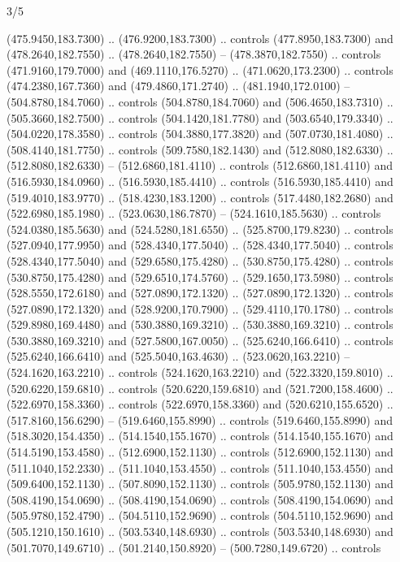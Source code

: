 \begin{flagdescription}{3/5}
\begin{scope}[shift={(0.5\flaglength,0.5\flagwidth)},scale=\flagwidth/510]
\begin{scope}[y=0.80pt, x=0.80pt, yscale=-1.06, xscale=1.06,yshift=-240pt,xshift=-400pt]
\begin{scope}[cm={{0.83333,0.0,0.0,0.83333,(154.64672,48.64761)}}]
\begin{scope}[cm={{0.93334,0.0,0.0,0.93334,(-4.86471,22.64035)}}]
\begin{scope}[line width=0.489\lw]
\begin{scope}[draw=c003300,fill=c338a00]
  (475.9450,183.7300) .. (476.9200,183.7300) .. controls (477.8950,183.7300) and
  (478.2640,182.7550) .. (478.2640,182.7550) -- (478.3870,182.7550) .. controls
  (471.9160,179.7000) and (469.1110,176.5270) .. (471.0620,173.2300) .. controls
  (474.2380,167.7360) and (479.4860,171.2740) .. (481.1940,172.0100) --
  (504.8780,184.7060) .. controls (504.8780,184.7060) and (506.4650,183.7310) ..
  (505.3660,182.7500) .. controls (504.1420,181.7780) and (503.6540,179.3340) ..
  (504.0220,178.3580) .. controls (504.3880,177.3820) and (507.0730,181.4080) ..
  (508.4140,181.7750) .. controls (509.7580,182.1430) and (512.8080,182.6330) ..
  (512.8080,182.6330) -- (512.6860,181.4110) .. controls (512.6860,181.4110) and
  (516.5930,184.0960) .. (516.5930,185.4410) .. controls (516.5930,185.4410) and
  (519.4010,183.9770) .. (518.4230,183.1200) .. controls (517.4480,182.2680) and
  (522.6980,185.1980) .. (523.0630,186.7870) -- (524.1610,185.5630) .. controls
  (524.0380,185.5630) and (524.5280,181.6550) .. (525.8700,179.8230) .. controls
  (527.0940,177.9950) and (528.4340,177.5040) .. (528.4340,177.5040) .. controls
  (528.4340,177.5040) and (529.6580,175.4280) .. (530.8750,175.4280) .. controls
  (530.8750,175.4280) and (529.6510,174.5760) .. (529.1650,173.5980) .. controls
  (528.5550,172.6180) and (527.0890,172.1320) .. (527.0890,172.1320) .. controls
  (527.0890,172.1320) and (528.9200,170.7900) .. (529.4110,170.1780) .. controls
  (529.8980,169.4480) and (530.3880,169.3210) .. (530.3880,169.3210) .. controls
  (530.3880,169.3210) and (527.5800,167.0050) .. (525.6240,166.6410) .. controls
  (525.6240,166.6410) and (525.5040,163.4630) .. (523.0620,163.2210) --
  (524.1620,163.2210) .. controls (524.1620,163.2210) and (522.3320,159.8010) ..
  (520.6220,159.6810) .. controls (520.6220,159.6810) and (521.7200,158.4600) ..
  (522.6970,158.3360) .. controls (522.6970,158.3360) and (520.6210,155.6520) ..
  (517.8160,156.6290) -- (519.6460,155.8990) .. controls (519.6460,155.8990) and
  (518.3020,154.4350) .. (514.1540,155.1670) .. controls (514.1540,155.1670) and
  (514.5190,153.4580) .. (512.6900,152.1130) .. controls (512.6900,152.1130) and
  (511.1040,152.2330) .. (511.1040,153.4550) .. controls (511.1040,153.4550) and
  (509.6400,152.1130) .. (507.8090,152.1130) .. controls (505.9780,152.1130) and
  (508.4190,154.0690) .. (508.4190,154.0690) .. controls (508.4190,154.0690) and
  (505.9780,152.4790) .. (504.5110,152.9690) .. controls (504.5110,152.9690) and
  (505.1210,150.1610) .. (503.5340,148.6930) .. controls (503.5340,148.6930) and
  (501.7070,149.6710) .. (501.2140,150.8920) -- (500.7280,149.6720) .. controls

\end{scope}
\end{scope}
\end{scope}
\end{scope}
\end{scope}
\end{scope}
\end{flagdescription}
